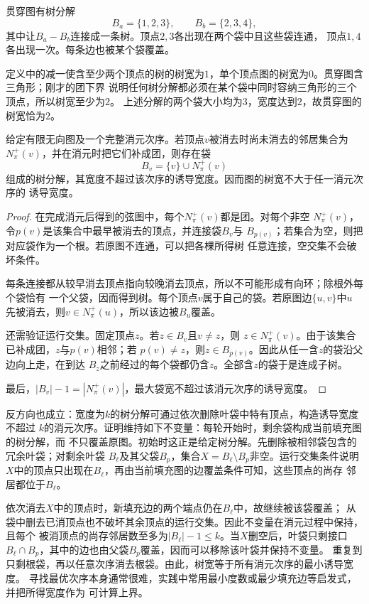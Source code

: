 贯穿图有树分解
\[
  B_a=\{1,2,3\},\qquad B_b=\{2,3,4\},
\]
其中让\(B_a-B_b\)连接成一条树。顶点\(2,3\)各出现在两个袋中且这些袋连通，
顶点\(1,4\)各出现一次。每条边也被某个袋覆盖。

定义中的减一使含至少两个顶点的树的树宽为\(1\)，单个顶点图的树宽为\(0\)。贯穿图含三角形；刚才的团下界
说明任何树分解都必须在某个袋中同时容纳三角形的三个顶点，所以树宽至少为\(2\)。
上述分解的两个袋大小均为\(3\)，宽度达到\(2\)，故贯穿图的树宽恰为\(2\)。

\begin{theorem}[消元序产生树分解]
  \label{thm:graph-theory-elimination-tree-decomposition}
  给定有限无向图及一个完整消元次序。若顶点\(v\)被消去时尚未消去的邻居集合为
  \(N^+_{\pi}(v)\)，并在消元时把它们补成团，则存在袋
  \[
    B_v=\{v\}\cup N^+_{\pi}(v)
  \]
  组成的树分解，其宽度不超过该次序的诱导宽度。因而图的树宽不大于任一消元次序的
  诱导宽度。
\end{theorem}

\begin{proof}
在完成消元后得到的弦图中，每个\(N^+_{\pi}(v)\)都是团。对每个非空
\(N^+_{\pi}(v)\)，令\(p(v)\)是该集合中最早被消去的顶点，并连接袋\(B_v\)与
\(B_{p(v)}\)；若集合为空，则把对应袋作为一个根。若原图不连通，可以把各棵所得树
任意连接，空交集不会破坏条件。

每条连接都从较早消去顶点指向较晚消去顶点，所以不可能形成有向环；除根外每个袋恰有
一个父袋，因而得到树。每个顶点\(v\)属于自己的袋。若原图边\(\{u,v\}\)中\(u\)
先被消去，则\(v\in N^+_{\pi}(u)\)，所以该边被\(B_u\)覆盖。

还需验证运行交集。固定顶点\(z\)。若\(z\in B_v\)且\(v\neq z\)，则
\(z\in N^+_{\pi}(v)\)。由于该集合已补成团，\(z\)与\(p(v)\)相邻；若
\(p(v)\neq z\)，则\(z\in B_{p(v)}\)。因此从任一含\(z\)的袋沿父边向上走，在到达
\(B_z\)之前经过的每个袋都仍含\(z\)。全部含\(z\)的袋于是连成子树。

最后，\(|B_v|-1=|N^+_{\pi}(v)|\)，最大袋宽不超过该消元次序的诱导宽度。
\end{proof}

反方向也成立：宽度为\(k\)的树分解可通过依次删除叶袋中特有顶点，构造诱导宽度不超过
\(k\)的消元次序。证明维持如下不变量：每轮开始时，剩余袋构成当前填充图的树分解，而
不只覆盖原图。初始时这正是给定树分解。先删除被相邻袋包含的冗余叶袋；对剩余叶袋
\(B_\ell\)及其父袋\(B_p\)，集合\(X=B_\ell\setminus B_p\)非空。运行交集条件说明
\(X\)中的顶点只出现在\(B_\ell\)，再由当前填充图的边覆盖条件可知，这些顶点的尚存
邻居都位于\(B_\ell\)。

依次消去\(X\)中的顶点时，新填充边的两个端点仍在\(B_\ell\)中，故继续被该袋覆盖；
从袋中删去已消顶点也不破坏其余顶点的运行交集。因此不变量在消元过程中保持，且每个
被消顶点的尚存邻居数至多为\(|B_\ell|-1\leq k\)。当\(X\)删空后，叶袋只剩接口
\(B_\ell\cap B_p\)，其中的边也由父袋\(B_p\)覆盖，因而可以移除该叶袋并保持不变量。
重复到只剩根袋，再以任意次序消去根袋。由此，树宽等于所有消元次序的最小诱导宽度。
寻找最优次序本身通常很难，实践中常用最小度数或最少填充边等启发式，并把所得宽度作为
可计算上界。

